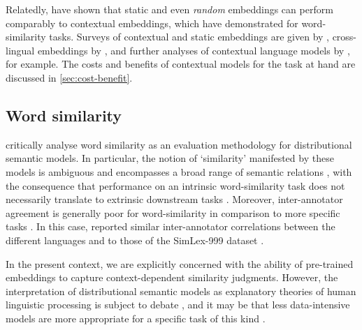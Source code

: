 Relatedly, \textcites{Arora2020} have shown that static and even \emph{random}
embeddings can perform comparably to contextual embeddings, which
\textcites[5244-5246]{Gupta2019}[4760-4762]{Bommasani2020} have demonstrated for
word-similarity tasks.
Surveys of contextual and static embeddings are given by
\textcites{Liu2020}{Torregrossa2021}, cross-lingual embeddings by
\textcites{Ruder2019}, and further analyses of contextual language models by
\textcites{Reif2019}{Brunner2019}, for example.
The costs and benefits of contextual models for the task at hand are discussed in
\cref{sec:cost-benefit}.

\subsection{Word similarity}

\textcites{Batchkarov2016} critically analyse word similarity as an evaluation
methodology for distributional semantic models.
In particular, the notion of `similarity' manifested by these models is ambiguous
\parencites{Elekes2020} and encompasses a broad range of semantic relations
\parencites[2]{Pado2003}, with the consequence that performance on an intrinsic
word-similarity task does not necessarily translate to extrinsic downstream tasks
\parencites[7-8]{Batchkarov2016}.
Moreover, inter-annotator agreement is generally poor for word-similarity in comparison
to more specific tasks \parencites[8-9]{Batchkarov2016}.
In this case, \textcites[8]{Armendariz2020}[42]{Armendariz2020a} reported similar
inter-annotator correlations between the different languages and to those of the
SimLex-999 dataset \parencites[678-680]{Hill2015}.

In the present context, we are explicitly concerned with the ability of pre-trained
embeddings to capture context-dependent similarity judgments.
However, the interpretation of distributional semantic models as explanatory theories
of human linguistic processing is subject to debate
\parencites{Gunther2019}{Westera2019}, and it may be that less data-intensive models
are more appropriate for a specific task of this kind \parencites{DeDeyne2016}.
